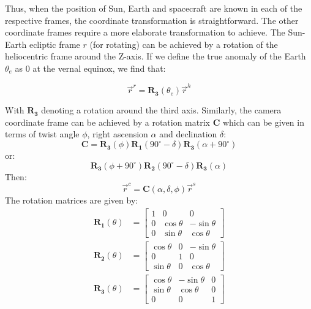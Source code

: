 \documentclass[a4paper,10pt]{article}
\begin{document}
Thus, when the position of Sun, Earth and spacecraft are known in each of the respective frames, the coordinate transformation is straightforward. The other coordinate frames require a more elaborate transformation to achieve. The Sun-Earth ecliptic frame $r$ (for rotating) can be achieved by a rotation of the heliocentric frame around the Z-axis. If we define the true anomaly of the Earth $\theta_e$ as 0 at the vernal equinox, we find that:

\begin{equation}
 \vec{r}^r = \mathbf{R_3}(\theta_e) \vec{r}^h
\end{equation}

With $\mathbf{R_3}$ denoting a rotation around the third axis. Similarly, the camera coordinate frame can be achieved by a rotation matrix $\mathbf{C}$ which can be given in terms of twist angle $\phi$, right ascension $\alpha$ and declination $\delta$:
\begin{equation}
 \mathbf{C} = \mathbf{R_3}(\phi)\mathbf{R_1}(90^\circ - \delta)\mathbf{R_3}(\alpha + 90^\circ)
\end{equation}
or:
\begin{equation}
 \mathbf{R_3}(\phi + 90^\circ)\mathbf{R_2}(90^\circ - \delta)\mathbf{R_3}(\alpha)
\end{equation}
Then:
\begin{equation}
 \vec{r}^c = \mathbf{C}(\alpha, \delta, \phi)\vec{r}^s
\end{equation}
The rotation matrices are given by:
\begin{align}
 \mathbf{R_1}(\theta) &= \begin{bmatrix}1 & 0 & 0 \\ 0 & \cos \theta & -\sin \theta \\ 0 & \sin \theta & \cos \theta \end{bmatrix} \\
 \mathbf{R_2}(\theta) &= \begin{bmatrix} \cos \theta & 0 & - \sin \theta \\ 0 & 1 & 0 \\ \sin \theta & 0 & \cos \theta \end{bmatrix} \\
 \mathbf{R_3}(\theta) &= \begin{bmatrix} \cos \theta & -\sin \theta & 0 \\ \sin \theta & \cos \theta & 0 \\ 0 & 0 & 1 \end{bmatrix}
\end{align}
\end{document}
